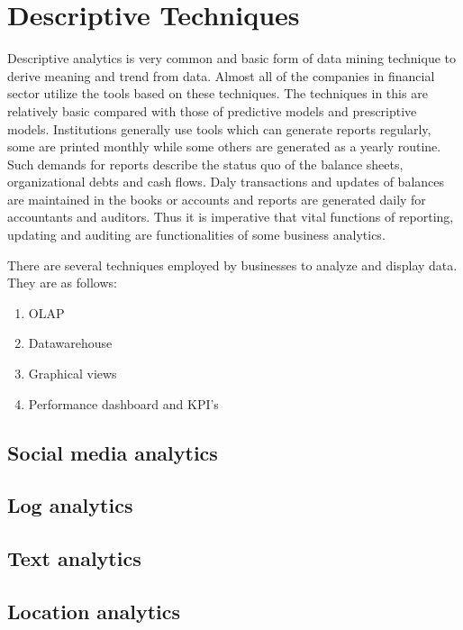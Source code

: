 \setlength{\footskip}{8mm}

\chapter{Descriptive Techniques} 
\label{ch:literature-review}
Descriptive analytics is very common and basic form of data mining technique to derive meaning and trend from data. Almost all of the companies in financial sector utilize the tools based on these techniques. The techniques in this are relatively basic compared with those of predictive models and prescriptive models. Institutions generally use tools which can generate reports regularly, some are printed monthly while some others are generated  as a yearly routine. Such demands for reports describe the status quo of the balance sheets, organizational debts and cash flows. Daly transactions and updates of balances are maintained in the books or accounts and reports are generated daily for accountants and auditors. Thus it is imperative that vital functions of reporting, updating and auditing are functionalities of some business analytics.

There are several techniques employed by businesses to analyze and display data. They are as follows:
\begin{enumerate}
	\item OLAP
	\item Datawarehouse
	\item Graphical views
	\item Performance dashboard and KPI's
\end{enumerate}

\section{Social media analytics}
\section{Log analytics}
\section{Text analytics}
\section{Location analytics}



%
%
%
%

\setlength{\footskip}{8mm}

